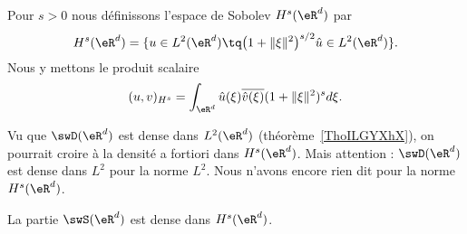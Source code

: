 \begin{definition}     \label{DEFooWEAQooAIWBwx}
    Pour \( s>0\) nous définissons l'espace de Sobolev \( H^s(\eR^d)\) par
    \begin{equation}
        H^s(\eR^d)=\{ u\in L^2(\eR^d)\tq  \big( 1+\| \xi \|^2 \big)^{s/2}\hat u\in L^2(\eR^d)  \}.
    \end{equation}
    Nous y mettons le produit scalaire
    \begin{equation}
        (u,v)_{H^s}=\int_{\eR^d}\hat u(\xi)\overline{ \hat v(\xi) }(1+\| \xi \|^2)^sd\xi.
    \end{equation}
\end{definition}

\begin{normaltext}
    Vu que \( \swD(\eR^d)\) est dense dans \( L^2(\eR^d)\) (théorème~\ref{ThoILGYXhX}), on pourrait croire à la densité a fortiori dans \( H^s(\eR^d)\). Mais attention : \( \swD(\eR^d)\) est dense dans \( L^2\) pour la norme \( L^2\). Nous n'avons encore rien dit pour la norme \( H^s(\eR^d)\).
\end{normaltext}

\begin{proposition}      \label{PROPooMKAFooKDNTbO}
    La partie \( \swS(\eR^d)\) est dense dans \( H^s(\eR^d)\).
\end{proposition}

